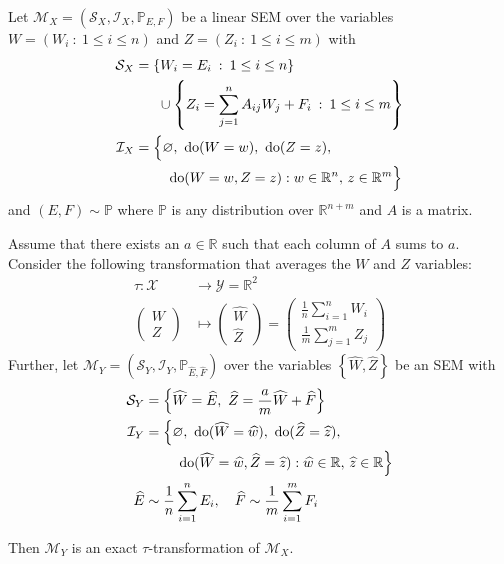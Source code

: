 \begin{theorem}\label{theorem:micro-macro}
Let ${\mathcal{M}_X = \left(\mathcal{S}_X, \mathcal{I}_X, \mathbb{P}_{E,F} \right)}$ be a linear SEM over the variables ${W=\left( W_i \: : \: 1\leq  i \leq n \right)}$ and ${Z=\left( Z_i \: : \: 1\leq  i \leq m \right)}$ with
%
\begin{align*}
\mathcal{S}_X &= \left\lbrace W_i = E_i \:  : \: 1 \leq i \leq n  \right\rbrace \\
& \quad \ \  \cup \left\lbrace Z_i = \sum_{j=1}^n A_{ij}W_j  + F_{i} \:  : \: 1\leq i \leq m \right\rbrace \\
%
\mathcal{I}_X &= \Big{\{} \nulli, \ \doop(W= w), \ \doop(Z= z), \\
& \qquad\ \doop(W= w, Z= z ) :   w \in \mathbb{R}^{n}, \, z \in \mathbb{R}^m \Big{\}}
%
\end{align*}
%
and $(E,F)  \sim \mathbb{P}$ where $\mathbb{P}$ is any distribution over $\mathbb{R}^{n+m}$ and $A$ is a matrix.

Assume that there exists an $a\in \mathbb{R}$ such that each column of $A$ sums to $a$. Consider the following transformation that averages the $W$ and $Z$ variables:
%
\begin{align*}
\tau : \mathcal{X} &\rightarrow \mathcal{Y} = \mathbb{R}^2 \\
\begin{pmatrix} W \\ Z \end{pmatrix} &\mapsto \begin{pmatrix} \widehat{W} \\ \widehat{Z} \end{pmatrix} = \begin{pmatrix} \frac{1}{n}\sum_{i=1}^n W_i \\ \frac{1}{m}\sum_{j=1}^m Z_j  \end{pmatrix}
\end{align*}
%
Further, let $\mathcal{M}_Y = \left(\mathcal{S}_Y, \mathcal{I}_Y, \mathbb{P}_{\widehat{E},\widehat{F}} \right)$ over the variables ${\left\lbrace \widehat{W}, \widehat{Z} \right\rbrace}$ be an SEM with
%
\begin{align*}
\mathcal{S}_Y &= \Big\lbrace \widehat{W} = \widehat{E}, \ \widehat{Z} = \frac{a}{m}\widehat{W} + \widehat{F} \Big\rbrace \\
%
\mathcal{I}_Y &= \Big{\{} \nulli,\ \doop(\widehat{W}= \widehat{w}), \ \doop(\widehat{Z}= \widehat{z}), \\
& \qquad\ \doop(\widehat{W}= \widehat{w}, \widehat{Z}= \widehat{z} ) :   \widehat{w} \in \mathbb{R}, \, \widehat{z} \in \mathbb{R} \Big{\}} \\
%
\widehat{E}  & \sim \frac{1}{n}\sum_{i=1}^{n} E_i, \quad
\widehat{F}  \sim \frac{1}{m}\sum_{i=1}^{m} F_i
\end{align*}

Then $\mathcal{M}_Y$ is an exact $\tau$-transformation of $\mathcal{M}_X$.
\end{theorem}



